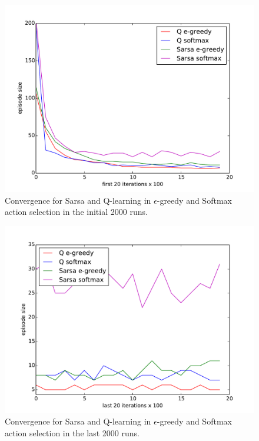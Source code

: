 \documentclass[paper=a4, fontsize=11pt]{scrartcl}
\numberwithin{equation}{section}		%
\numberwithin{figure}{section}			%
\numberwithin{table}{section}				%
\begin{document}
\begin{figure}[H] \centering
\includegraphics[scale=0.5]{sarsafirst20x100.pdf}
\caption{Convergence for Sarsa and Q-learning in $\epsilon$-greedy and Softmax action selection in the initial 2000 runs.} 
\label{figure:sarsafirst20}
\end{figure}
\begin{figure}[H] \centering
\includegraphics[scale=0.5]{sarsalast20x100.pdf}
\caption{Convergence for Sarsa and Q-learning in $\epsilon$-greedy and Softmax action selection in the last 2000 runs.} 
\label{figure:sarsalast20}
\end{figure}
\end{document}
